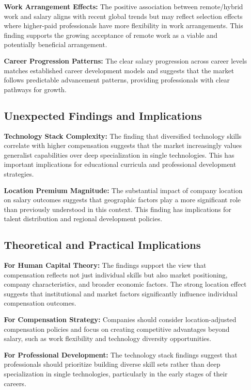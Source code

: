 \textbf{Work Arrangement Effects:} The positive association between remote/hybrid work and salary aligns with recent global trends but may reflect selection effects where higher-paid professionals have more flexibility in work arrangements. This finding supports the growing acceptance of remote work as a viable and potentially beneficial arrangement.

\textbf{Career Progression Patterns:} The clear salary progression across career levels matches established career development models and suggests that the market follows predictable advancement patterns, providing professionals with clear pathways for growth.

\subsection*{Unexpected Findings and Implications}

\textbf{Technology Stack Complexity:} The finding that diversified technology skills correlate with higher compensation suggests that the market increasingly values generalist capabilities over deep specialization in single technologies. This has important implications for educational curricula and professional development strategies.

\textbf{Location Premium Magnitude:} The substantial impact of company location on salary outcomes suggests that geographic factors play a more significant role than previously understood in this context. This finding has implications for talent distribution and regional development policies.

\subsection*{Theoretical and Practical Implications}

\textbf{For Human Capital Theory:} The findings support the view that compensation reflects not just individual skills but also market positioning, company characteristics, and broader economic factors. The strong location effect suggests that institutional and market factors significantly influence individual compensation outcomes.

\textbf{For Compensation Strategy:} Companies should consider location-adjusted compensation policies and focus on creating competitive advantages beyond salary, such as work flexibility and technology diversity opportunities.

\textbf{For Professional Development:} The technology stack findings suggest that professionals should prioritize building diverse skill sets rather than deep specialization in single technologies, particularly in the early stages of their careers.

